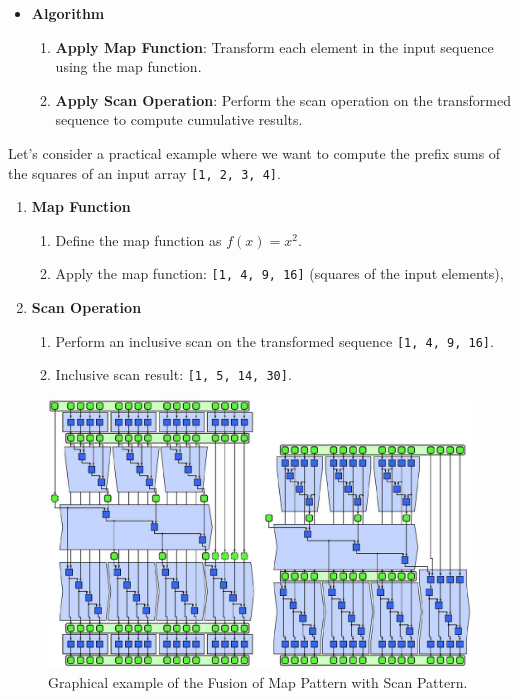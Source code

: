 \begin{itemize}
\begin{itemize}
        \item[\textcolor{Green3}{\faIcon{tools}}] \textcolor{Green3}{\textbf{Algorithm}}
        \begin{enumerate}
            \item \textbf{Apply Map Function}: Transform each element in the input sequence using the map function.
            \item \textbf{Apply Scan Operation}: Perform the scan operation on the transformed sequence to compute cumulative results.
        \end{enumerate}
    \end{itemize}
    \begin{examplebox}
        Let's consider a practical example where we want to compute the prefix sums of the squares of an input array \texttt{[1, 2, 3, 4]}.
        \begin{enumerate}
            \item \textbf{Map Function}
            \begin{enumerate}
                \item Define the map function as $f\left(x\right) = x^{2}$.
                \item Apply the map function: \texttt{[1, 4, 9, 16]} (squares of the input elements),
            \end{enumerate}
            \item \textbf{Scan Operation}
            \begin{enumerate}
                \item Perform an inclusive scan on the transformed sequence \texttt{[1, 4, 9, 16]}.
                \item Inclusive scan result: \texttt{[1, 5, 14, 30]}.
            \end{enumerate}
        \end{enumerate}
    \end{examplebox}
    \begin{figure}[!htp]
        \centering
        \includegraphics[width=\textwidth]{img/fusion-map-with-scan-1.pdf}
        \caption{Graphical example of the Fusion of Map Pattern with Scan Pattern.}
    \end{figure}
\end{itemize}
